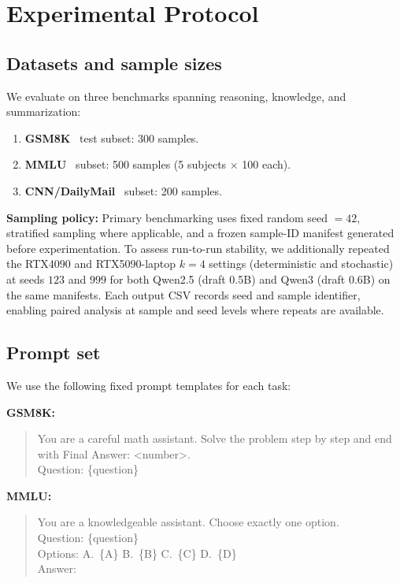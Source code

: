 \section{Experimental Protocol}
\label{sec:protocol}

\subsection{Datasets and sample sizes}

We evaluate on three benchmarks spanning reasoning, knowledge, and summarization:
\begin{enumerate}
    \item \textbf{GSM8K}~\cite{Cobbe2021} test subset: 300 samples.
    \item \textbf{MMLU}~\cite{Hendrycks2020} subset: 500 samples (5 subjects $\times$ 100 each).
    \item \textbf{CNN/DailyMail}~\cite{See2017} subset: 200 samples.
\end{enumerate}

\noindent\textbf{Sampling policy:} Primary benchmarking uses fixed random seed $= 42$, stratified sampling where applicable, and a frozen sample-ID manifest generated before experimentation. To assess run-to-run stability, we additionally repeated the RTX4090 and RTX5090-laptop $k{=}4$ settings (deterministic and stochastic) at seeds $123$ and $999$ for both Qwen2.5 (draft 0.5B) and Qwen3 (draft 0.6B) on the same manifests. Each output CSV records seed and sample identifier, enabling paired analysis at sample and seed levels where repeats are available.

\subsection{Prompt set}

We use the following fixed prompt templates for each task:

\smallskip\noindent\textbf{GSM8K:}
\begin{quote}\small
You are a careful math assistant. Solve the problem step by step and end with
Final Answer: \textless number\textgreater.\\
Question: \{question\}
\end{quote}

\noindent\textbf{MMLU:}
\begin{quote}\small
You are a knowledgeable assistant. Choose exactly one option.\\
Question: \{question\}\\
Options: A.~\{A\} B.~\{B\} C.~\{C\} D.~\{D\}\\
Answer:
\end{quote}

